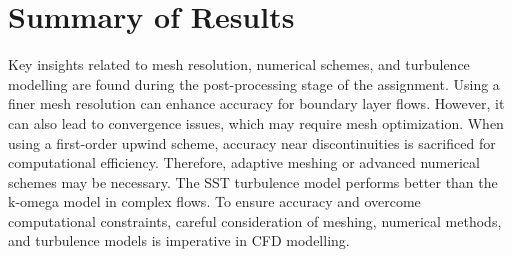 \section{Summary of Results}

Key insights related to mesh resolution, numerical schemes, and turbulence modelling are found during the post-processing stage of the assignment. Using a finer mesh resolution can enhance accuracy for boundary layer flows. However, it can also lead to convergence issues, which may require mesh optimization. When using a first-order upwind scheme, accuracy near discontinuities is sacrificed for computational efficiency. Therefore, adaptive meshing or advanced numerical schemes may be necessary. The SST turbulence model performs better than the k-omega model in complex flows. To ensure accuracy and overcome computational constraints, careful consideration of meshing, numerical methods, and turbulence models is imperative in CFD modelling.